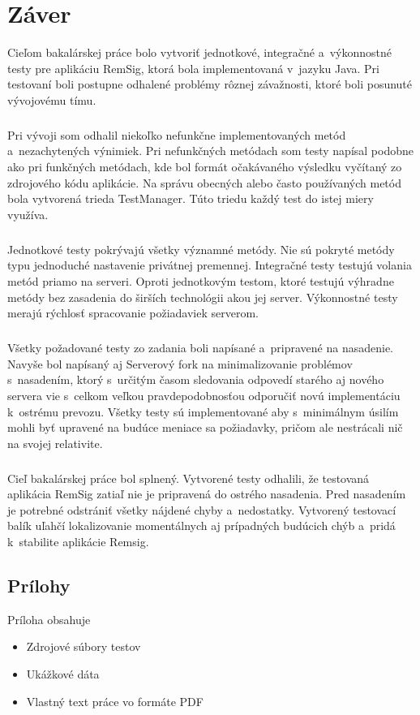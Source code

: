 \documentclass[
  digital, %
  table,   %
oneside,
  nolof,     %
  nolot,     %
]{fithesis3}
\begin{document}
\chapter{Záver}
Cieľom bakalárskej práce bolo vytvoriť jednotkové, integračné a~výkonnostné testy pre aplikáciu RemSig, ktorá bola implementovaná v~jazyku Java. Pri testovaní boli postupne odhalené problémy rôznej závažnosti, ktoré boli posunuté vývojovému tímu. \paragraph{}
Pri vývoji som odhalil niekoľko nefunkčne implementovaných metód a~nezachytených výnimiek. Pri nefunkčných metódach som testy napísal podobne ako pri funkčných metódach, kde bol formát očakávaného výsledku vyčítaný zo zdrojového kódu aplikácie. Na správu obecných alebo často používaných metód bola vytvorená trieda TestManager. Túto triedu každý test do istej miery využíva. \paragraph{}
Jednotkové testy pokrývajú všetky významné metódy. Nie sú pokryté metódy typu jednoduché nastavenie privátnej premennej. Integračné testy testujú volania metód priamo na serveri. Oproti jednotkovým testom, ktoré testujú výhradne metódy bez zasadenia do širších technológii akou jej server. Výkonnostné testy merajú rýchlosť spracovanie požiadaviek serverom.\paragraph{}
Všetky požadované testy zo zadania boli napísané a~pripravené na nasadenie. Navyše bol napísaný aj Serverový fork na minimalizovanie problémov s~nasadením, ktorý s~určitým časom sledovania odpovedí starého aj nového servera vie s~celkom veľkou pravdepodobnosťou odporučiť novú implementáciu k~ostrému prevozu. Všetky testy sú  implementované aby s~minimálnym úsilím mohli byť upravené na budúce meniace sa požiadavky, pričom ale nestrácali nič na svojej relativite.\paragraph{}
Cieľ bakalárskej práce bol splnený. Vytvorené testy odhalili, že testovaná aplikácia RemSig zatiaľ nie je pripravená do ostrého nasadenia. Pred nasadením je potrebné odstrániť všetky nájdené chyby a~nedostatky. Vytvorený testovací balík uľahčí lokalizovanie momentálnych aj prípadných budúcich chýb a~pridá k~stabilite aplikácie Remsig.

\printbibliography

  

\begin{appendix}


\chapter{Prílohy}
Príloha obsahuje
\begin{itemize}
	\item Zdrojové súbory testov
	\item Ukážkové dáta 
	\item Vlastný text práce vo formáte PDF
\end{itemize}



\end{appendix}
\end{document}
